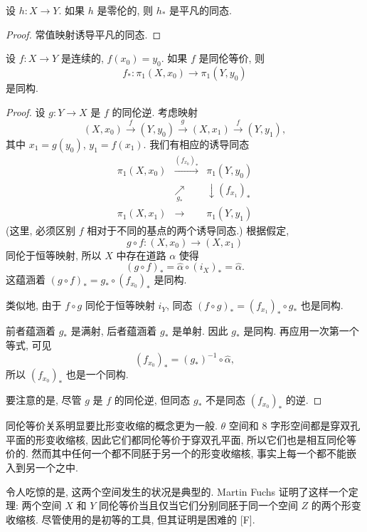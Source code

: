 \begin{corollary}
\label{corollary:ch09-sec58-58-6}
设 $h\colon X\to Y$. 如果 $h$ 是零伦的, 则 $h_*$ 是平凡的同态.
\end{corollary}

\begin{proof}
常值映射诱导平凡的同态.
\end{proof}

\begin{theorem}
\label{theorem:ch09-sec58-58-7}
设 $f\colon X\to Y$ 是连续的, $f(x_0)=y_0$. 如果 $f$ 是同伦等价, 则
\[
f_{*}\colon\pi_{1}(X,x_{0})\longrightarrow\pi_{1}(Y,y_{0})
\]
是同构.
\end{theorem}

\begin{proof}
设 $g\colon Y\to X$ 是 $f$ 的同伦逆. 考虑映射
\[
(X,x_{0})\xrightarrow{f}(Y,y_{0})\xrightarrow{g}(X,x_{1})\xrightarrow{f}(Y,y_{1}),
\]
其中 $x_1=g(y_0)$, $y_1=f(x_1)$. 我们有相应的诱导同态
\[
\begin{array}{ccc}
\pi_{1}(X,x_{0}) & \xrightarrow{(f_{x_{0}})_{*}} & \pi_{1}(Y,y_{0})\\
 & \underset{g_{*}}{\nearrow} & \downarrow{\scriptstyle(f_{x_{1}})_{*}}\\
\pi_{1}(X,x_{1}) & \xrightarrow{} & \pi_{1}(Y,y_{1})
\end{array}
\]
(这里, 必须区别 $f$ 相对于不同的基点的两个诱导同态.) 根据假定,
\[
g\circ f\colon(X,x_{0})\longrightarrow(X,x_{1})
\]
同伦于恒等映射, 所以 $X$ 中存在道路 $\alpha$ 使得
\[
(g\circ f)_{*}=\hat{\alpha}\circ(i_{X})_{*}=\hat{\alpha}.
\]
这蕴涵着 $(g\circ f)_*=g_*\circ(f_{x_0})_*$ 是同构.

类似地, 由于 $f\circ g$ 同伦于恒等映射 $i_Y$, 同态 $(f\circ g)_*=(f_{x_1})_*\circ g_*$ 也是同构.

前者蕴涵着 $g_*$ 是满射, 后者蕴涵着 $g_*$ 是单射. 因此 $g_*$ 是同构. 再应用一次第一个等式, 可见
\[
(f_{x_{0}})_{*}=(g_{*})^{-1}\circ\hat{\alpha},
\]
所以 $(f_{x_0})_*$ 也是一个同构.

要注意的是, 尽管 $g$ 是 $f$ 的同伦逆, 但同态 $g_*$ 不是同态 $(f_{x_0})_*$ 的逆.
\end{proof}

同伦等价关系明显要比形变收缩的概念更为一般. $\theta$ 空间和 8 字形空间都是穿双孔平面的形变收缩核, 因此它们都同伦等价于穿双孔平面, 所以它们也是相互同伦等价的. 然而其中任何一个都不同胚于另一个的形变收缩核, 事实上每一个都不能嵌入到另一个之中.

令人吃惊的是, 这两个空间发生的状况是典型的. Martin Fuchs 证明了这样一个定理: 两个空间 $X$ 和 $Y$ 同伦等价当且仅当它们分别同胚于同一个空间 $Z$ 的两个形变收缩核. 尽管使用的是初等的工具, 但其证明是困难的 [F].

